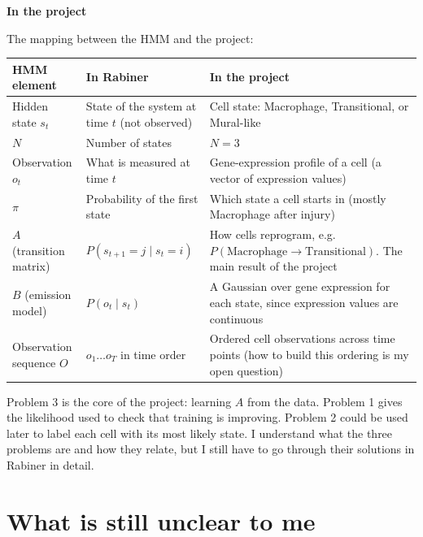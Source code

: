 \documentclass[10pt,a4paper]{article}
\newcommand{\sub}[1]{\vspace{1pt}\textbf{\textcolor{gray!80!black}{#1}}\par}
\begin{document}
\sub{In the project}
The mapping between the HMM and the project:

\begin{center}
\renewcommand{\arraystretch}{1.1}\small
\begin{tabular}{@{}>{\raggedright\arraybackslash}p{3.0cm} >{\raggedright\arraybackslash}p{4.8cm} >{\raggedright\arraybackslash}p{8.4cm}@{}}
\toprule
\textbf{HMM element} & \textbf{In Rabiner} & \textbf{In the project} \\
\midrule
Hidden state $s_t$ & State of the system at time $t$ (not observed) & Cell state: Macrophage, Transitional, or Mural-like \\
$N$ & Number of states & $N = 3$ \\
Observation $o_t$ & What is measured at time $t$ & Gene-expression profile of a cell (a vector of expression values) \\
$\pi$ & Probability of the first state & Which state a cell starts in (mostly Macrophage after injury) \\
$A$ (transition matrix) & $P(s_{t+1}=j \mid s_t=i)$ & How cells reprogram, e.g.\ $P(\text{Macrophage}\to\text{Transitional})$. The main result of the project \\
$B$ (emission model) & $P(o_t \mid s_t)$ & A Gaussian over gene expression for each state, since expression values are continuous \\
Observation sequence $O$ & $o_1 \dots o_T$ in time order & Ordered cell observations across time points (how to build this ordering is my open question) \\
\bottomrule
\end{tabular}
\end{center}

Problem 3 is the core of the project: learning $A$ from the data. Problem 1 gives the likelihood used to check that training is improving. Problem 2 could be used later to label each cell with its most likely state. I understand what the three problems are and how they relate, but I still have to go through their solutions in Rabiner in detail.

\section{What is still unclear to me}
\end{document}
